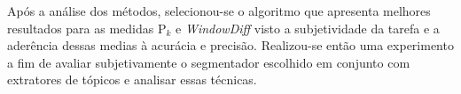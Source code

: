 


Após a análise dos métodos, selecionou-se o algoritmo que apresenta melhores resultados para as medidas P$_k$ e \textit{WindowDiff} visto a subjetividade da tarefa e a aderência dessas medias à acurácia e precisão. Realizou-se então uma experimento a fim de avaliar subjetivamente o segmentador escolhido em conjunto com extratores de tópicos e analisar essas técnicas.










